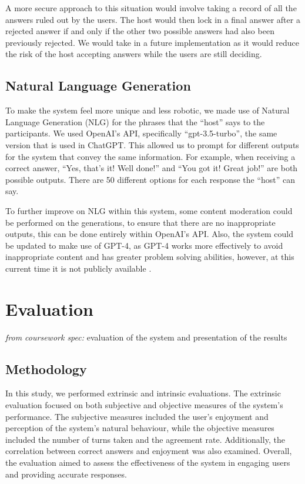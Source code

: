\documentclass[hidelinks, 11pt]{article}
\begin{document}
A more secure approach to this situation would involve taking a record of all the answers ruled out by the users. The host would then lock in a final answer after a rejected answer if and only if the other two possible answers had also been previously rejected. We would take in a future implementation as it would reduce the risk of the host accepting answers while the users are still deciding.

\subsection{Natural Language Generation}
\label{subsec:nlg}

To make the system feel more unique and less robotic, we made use of Natural Language Generation (NLG) for the phrases that the “host” says to the participants. We used OpenAI's API, specifically “gpt-3.5-turbo”, the same version that is used in ChatGPT. This allowed us to prompt for different outputs for the system that convey the same information. For example, when receiving a correct answer, “Yes, that's it! Well done!” and “You got it! Great job!” are both possible outputs. There are 50 different options for each response the “host” can say.

To further improve on NLG within this system, some content moderation could be performed on the generations, to ensure that there are no inappropriate outputs, this can be done entirely within OpenAI's API.  Also, the system could be updated to make use of GPT-4, as GPT-4 works more effectively to avoid inappropriate content and has greater problem solving abilities, however, at this current time it is not publicly available \cite{GPT_4_2023,OpenAI_2023}.


\section{Evaluation}
\label{sec:evaluation}

\textit{from coursework spec:} evaluation of the system and presentation of the results

\subsection{Methodology}
\label{subsec:methodology}
In this study, we performed extrinsic and intrinsic evaluations. The extrinsic evaluation focused on both subjective and objective measures of the system's performance. The subjective measures included the user's enjoyment and perception of the system's natural behaviour, while the objective measures included the number of turns taken and the agreement rate. Additionally, the correlation between correct answers and enjoyment was also examined. Overall, the evaluation aimed to assess the effectiveness of the system in engaging users and providing accurate responses.
\end{document}
